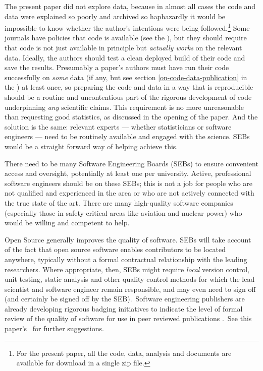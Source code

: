 {The present paper did not explore data, because in almost all cases the code and data were explained so poorly and archived so haphazardly it would be impossible to know whether the author's intentions were being followed.\footnote{{For the present paper, all the code, data, analysis and documents are available for download in a single zip file.}} Some journals have policies that code is available (see the \supplement), but they should require that code is not just available in principle but \emph{actually works\/} on the relevant data. Ideally, the authors should test a clean deployed build of their code and save the results. Presumably a paper's authors must have run their code successfully on \emph{some\/} data (if any, but see section \ref{on-code-data-publication} in the \supplement) at least once, so preparing the code and data in a way that is reproducible should be a routine and uncontentious part of the rigorous development of  code underpinning \emph{any\/} scientific claims. This requirement is no more unreasonable than requesting good statistics, as discussed in the opening of the paper. And the solution is the same: relevant experts --- whether statisticians or software engineers --- need to be routinely available and engaged with the science. SEBs would be a straight forward way of helping achieve this.}

There need to be many Software Engineering Boards (SEBs) to ensure convenient access and oversight, potentially at least one per university. Active, professional software engineers should be on these SEBs; this is not a job for people who are not qualified and experienced in the area or who are not actively connected with the true state of the art. There are many high-quality software companies (especially those in safety-critical areas like aviation and nuclear power) who would be willing and competent to help.

Open Source generally improves the quality of software. SEBs will take account of the fact that open source software enables contributors to be located anywhere, typically without a formal contractual relationship with the leading researchers. Where appropriate, then, SEBs might require \emph{local\/} version control, unit testing, static analysis {and other quality control methods for which the lead scientist and software engineer remain responsible, and may even need to sign off (and certainly be signed off by the SEB\@).}\ {Software engineering publishers are already developing rigorous badging initiatives to indicate the level of formal review of the quality of software for use in peer reviewed publications \cite{acm-artifacts}.}\ {See this paper's \supplement\ for further suggestions.}

